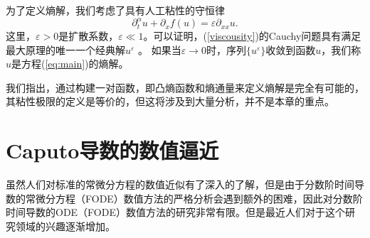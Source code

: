为了定义熵解，我们考虑了具有人工粘性的守恒律
\begin{equation}\label{viscousity}
\partial_t^\alpha u + \partial_x f(u) = \varepsilon \partial_{xx} u.
\end{equation}
这里，$\varepsilon>0$是扩散系数，$\varepsilon\ll 1$。可以证明，(\ref{viscousity})的Cauchy问题具有满足最大原理的唯一一个经典解$u^\varepsilon$ 。 如果当$\varepsilon \to 0$时，序列$\{u^\varepsilon\}$收敛到函数$u$，我们称$u$是方程(\ref{eq:main})的熵解。

我们指出，通过构建一对函数，即凸熵函数和熵通量来定义熵解是完全有可能的，其粘性极限的定义是等价的，但这将涉及到大量分析，并不是本章的重点。



\section{Caputo导数的数值逼近}


虽然人们对标准的常微分方程的数值近似有了深入的了解，但是由于分数阶时间导数的常微分方程（FODE）数值方法的严格分析会遇到额外的困难，因此对分数阶时间导数的ODE（FODE）数值方法的研究非常有限。但是最近人们对于这个研究领域的兴趣逐渐增加。

